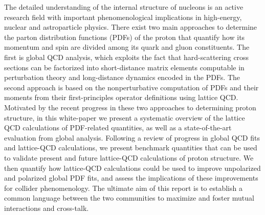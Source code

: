 \documentclass[11pt,a4paper]{article}
\numberwithin{equation}{section}
\numberwithin{figure}{section}
\numberwithin{table}{section}
\begin{document}
The detailed understanding of the internal structure of nucleons is an active
research field with important phenomenological implications in
high-energy, nuclear and astroparticle physics.
%
There exist two main approaches to determine the
parton distribution functions (PDFs) of the proton that
quantify how its momentum and spin 
are divided among its quark and gluon constituents.
%
The first is global QCD analysis, which exploits the fact that hard-scattering
cross sections can be factorized into short-distance matrix elements
computable in perturbation theory and long-distance dynamics encoded in the
PDFs.
%
The second approach is based on the nonperturbative
 computation of PDFs
and their moments from their first-principles operator
definitions using lattice QCD.
%
Motivated by the recent progress in these two approaches
to determining proton structure, in this white-paper we present a systematic
overview of the lattice QCD calculations of PDF-related quantities, as
well as a
state-of-the-art evaluation from global analysis.
%
Following a review of progress in global QCD fits and lattice-QCD calculations,
we present benchmark quantities that can be
used to validate present and future
lattice-QCD calculations of proton structure.
%
We then quantify how lattice-QCD calculations could be used
to improve unpolarized and polarized global PDF fits, and assess
the implications of these improvements for collider
phenomenology.
%
The ultimate aim of this report is
to establish a common language between the two communities to 
maximize and foster mutual interactions and cross-talk.

\tableofcontents

\clearpage













\appendix






\end{document}

